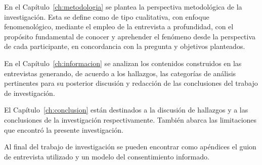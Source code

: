 En el Capítulo~\ref{ch:metodologia} se plantea la perspectiva
metodológica de la investigación.
Esta se define como de tipo cualitativa, con enfoque fenomenológico, mediante el
empleo de la entrevista a profundidad, con el propósito fundamental de conocer y
aprehender el fenómeno desde la perspectiva de cada participante, en
concordancia con la pregunta y objetivos planteados.

En el Capítulo~\ref{ch:informacion} se analizan los contenidos construidos en
las entrevistas generando, de acuerdo a los hallazgos, las categorías de
análisis pertinentes para su posterior discusión y redacción de las conclusiones
del trabajo de investigación.

El Capítulo~\ref{ch:conclusion} están destinados a la discusión de hallazgos y a
las conclusiones de la investigación respectivamente. También abarca las
limitaciones que encontró la presente investigación.

Al final del trabajo de investigación se pueden encontrar como apéndices el
guion de entrevista utilizado y un modelo del consentimiento informado.
